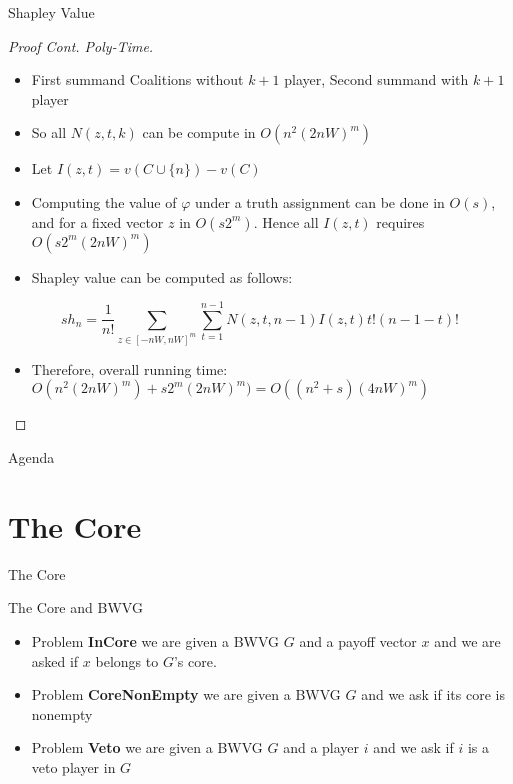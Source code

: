 \documentclass{beamer}
\begin{document}
\begin{frame}[fragile]{Shapley Value}
\begin{proof}[Proof Cont. Poly-Time]
  \begin{itemize}
    \item First summand Coalitions without $k+1$ player, Second summand with $k+1$ player
    \item So all $N(z,t,k)$ can be compute in $O(n^2(2nW)^m)$
    \item Let $I(z,t) = v(C \cup \{n\})-v(C)$
    \item Computing the value of $\varphi$ under a truth assignment can be done in $O(s)$, and for a fixed vector $z$ in $O(s2^m)$. Hence all $I(z,t)$ requires $O(s2^m(2nW)^m)$
    \item Shapley value can be computed as follows:
  \end{itemize}
  \begin{equation}
    sh_n = \frac{1}{n!} \sum_{z \in [-nW,nW]^m} \sum_{t=1}^{n-1} N(z,t,n-1)I(z,t)t!(n-1-t)!
  \end{equation}
  \begin{itemize}
    \item Therefore, overall running time: $O(n^2(2nW)^m)+s2^m(2nW)^m) = O((n^2+s)(4nW)^m)$
  \end{itemize}
\end{proof}
\end{frame}

\begin{frame}[fragile]{Agenda}
  \section{The Core}
  \tableofcontents[currentsection]
\end{frame}

\begin{frame}[fragile]{The Core}
  \begin{block}{The Core and BWVG}
    \begin{itemize}
      \item Problem \textbf{InCore} we are given a BWVG $G$ and a payoff vector $x$ and we are asked if $x$ belongs to $G$'s core.
      \item Problem \textbf{CoreNonEmpty} we are given a BWVG $G$ and we ask if its core is nonempty
      \item Problem \textbf{Veto} we are given a BWVG $G$ and a player $i$ and we ask if $i$ is a veto player in $G$
    \end{itemize}
  \end{block}
\end{frame}
\end{document}
